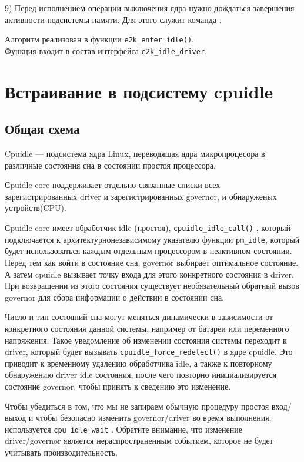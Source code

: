 \documentclass{article}
\begin{document}
9) Перед исполнением операции выключения ядра нужно дождаться завершения
активности подсистемы памяти. Для этого служит команда {}.

Алгоритм реализован в функции \texttt{e2k\_enter\_idle()}.\\ 
Функция входит в состав интерфейса \texttt{e2k\_idle\_driver}.

\newpage
\section{Встраивание в подсистему cpuidle}



\subsection{Общая схема}

Cpuidle --- подсистема ядра Linux, переводящая ядра микропроцесора в различные состояния сна в состоянии простоя процессора.

Сpuidle core поддерживает отдельно связанные списки всех \\ зарегистрированных driver и зарегистрированных governor, и обнаруженых устройств(CPU).

Сpuidle core имеет обработчик idle (простоя), \texttt{cpuidle\_idle\_call()} , который подключается к архитектурнонезависимому указателю функции \texttt{pm\_idle}, который будет использоваться каждым отдельным процессором в неактивном состоянии. Перед тем как войти в состояние сна, governor выбирает оптимальное состояние. А затем cpuidle вызывает точку входа для этого конкретного состояния в driver. При возвращении из этого состояния существует необязательный обратный вызов governor для сбора информации о действии в состоянии сна.

Число и тип состояний сна могут меняться динамически в зависимости от конкретного состояния данной системы, например от батареи или переменного напряжения. Такое уведомление об изменении состояния системы переходит к driver, который будет вызывать \texttt{cpuidle\_force\_redetect()} в ядре cpuidle. Это приводит к временному удалению обработчика idle, а также к повторному обнаружению driver idle состояния, после чего повторно инициализируется состояние governor, чтобы принять к сведению это изменение.

Чтобы убедиться в том, что мы не запираем обычную процедуру простоя вход/выход и чтобы безопасно изменить governor/driver во время выполнения, используется \texttt{cpu\_idle\_wait} . Обратите внимание, что изменение driver/governor является нераспространенным событием, которое не будет учитывать производительность.
\end{document}
